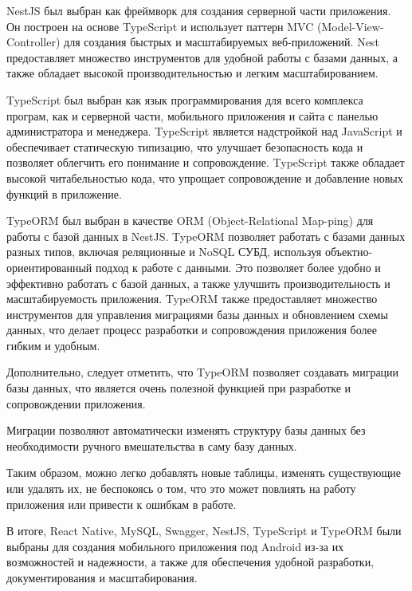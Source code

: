NestJS \cite{NestJsGuide} был выбран как фреймворк для создания серверной части приложения.
Он построен на основе TypeScript и использует паттерн MVC (Model-View-Controller) для создания быстрых и масштабируемых веб-приложений.
Nest предоставляет множество инструментов для удобной работы с базами данных, а также обладает высокой производительностью и легким масштабированием.

TypeScript \cite{TypeScriptGuide} был выбран как язык программирования для всего комплекса програм,
как и серверной части, мобильного приложения и сайта с панелью администратора и менеджера.
TypeScript является надстройкой над JavaScript и обеспечивает статическую типизацию, что улучшает безопасность кода и позволяет облегчить его понимание и сопровождение.
TypeScript также обладает высокой читабельностью кода, что упрощает сопровождение и добавление новых функций в приложение.

TypeORM \cite{TypeORM} \cite{TypeOrmQueryRunner} был выбран в качестве ORM (Object-Relational Map-ping) для работы с базой данных в NestJS.
TypeORM позволяет работать с базами данных разных типов, включая реляционные и NoSQL СУБД, используя объектно-ориентированный подход к работе с данными.
Это позволяет более удобно и эффективно работать с базой данных, а также улучшить производительность и масштабируемость приложения.
TypeORM также предоставляет множество инструментов для управления миграциями базы данных и обновлением схемы данных, что делает процесс разработки и сопровождения приложения более гибким и удобным.

Дополнительно, следует отметить, что TypeORM позволяет создавать миграции базы данных,
что является очень полезной функцией при разработке и сопровождении приложения.

Миграции позволяют автоматически изменять структуру базы данных
без необходимости ручного вмешательства в саму базу данных.

Таким образом, можно легко добавлять новые таблицы,
изменять существующие или удалять их, не беспокоясь о том,
что это может повлиять на работу приложения или привести к ошибкам в работе.

В итоге, React Native, MySQL, Swagger, NestJS, TypeScript и TypeORM были выбраны для создания мобильного приложения под Android из-за их возможностей и надежности,
а также для обеспечения удобной разработки, документирования и масштабирования.

\newpage
